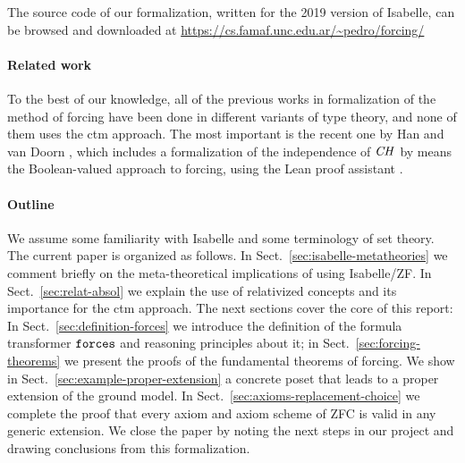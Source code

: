 The source code of our formalization, written for the 2019 version of
Isabelle, can be browsed and downloaded at
\url{https://cs.famaf.unc.edu.ar/~pedro/forcing/}


\paragraph{Related work}
To the best of our knowledge, all of the previous works in
formalization of the method 
of forcing have been done in different variants of type theory, and
none of them uses the ctm approach. The
most important is the recent one by 
Han and van Doorn
\cite{han_et_al:LIPIcs:2019:11074,DBLP:conf/cpp/HanD20}, which includes
a formalization of the independence of $\mathit{CH}$ by means
the Boolean-valued approach to forcing, using the Lean
proof assistant \cite{DBLP:conf/cade/MouraKADR15}.

\paragraph{Outline}
\label{sec:outline}

We assume some familiarity with Isabelle and some terminology of set
theory. The current paper is organized as follows. In
Sect.~\ref{sec:isabelle-metatheories} we comment briefly on the
meta-theoretical implications of using Isabelle/ZF. In
Sect.~\ref{sec:relat-absol} we explain the use of relativized concepts
and its importance for the ctm approach. The next sections cover the
core of this report: In Sect.~\ref{sec:definition-forces} we introduce
the definition of the formula transformer $\mathop{\mathtt{forces}}$ and reasoning
principles about it; in Sect.~\ref{sec:forcing-theorems} we present
the proofs of the fundamental theorems of forcing. We show in
Sect.~\ref{sec:example-proper-extension} a concrete poset that leads
to a proper extension of the ground model. In
Sect.~\ref{sec:axioms-replacement-choice} we complete the proof that
every axiom and axiom scheme of ZFC is valid in any generic extension.
We close the paper by noting the next steps in our project and drawing
conclusions from this formalization.

